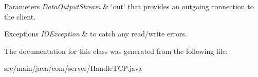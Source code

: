 \begin{DoxyParams}{Parameters}
{\em Data\-Output\-Stream} & \char`\"{}out\char`\"{} that provides an outgoing connection to the client. \\
\hline
\end{DoxyParams}

\begin{DoxyExceptions}{Exceptions}
{\em I\-O\-Exception} & to catch any read/write errors. \\
\hline
\end{DoxyExceptions}


The documentation for this class was generated from the following file\-:\begin{DoxyCompactItemize}
\item 
src/main/java/com/server/Handle\-T\-C\-P.\-java\end{DoxyCompactItemize}
